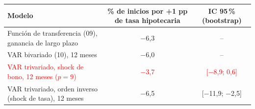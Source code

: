 \begin{tabular}{lcc}
\toprule
Modelo & \% de inicios por +1 pp de tasa hipotecaria & IC 95\,\% (bootstrap)
\\ \midrule
Funci\'on de transferencia (09), ganancia de largo plazo & \ensuremath{-}6{,}3 & -- \\
VAR bivariado (10), 12 meses & \ensuremath{-}6{,}0 & -- \\
\textcolor{red}{VAR trivariado, shock de bono, 12 meses ($p=9$)} & \textcolor{red}{\ensuremath{-}3{,}7} & \textcolor{red}{[\ensuremath{-}8{,}9; 0{,}6]} \\
VAR trivariado, orden inverso (shock de tasa), 12 meses & \ensuremath{-}6{,}5 & [\ensuremath{-}11{,}9; \ensuremath{-}2{,}5] \\
\bottomrule
\end{tabular}
